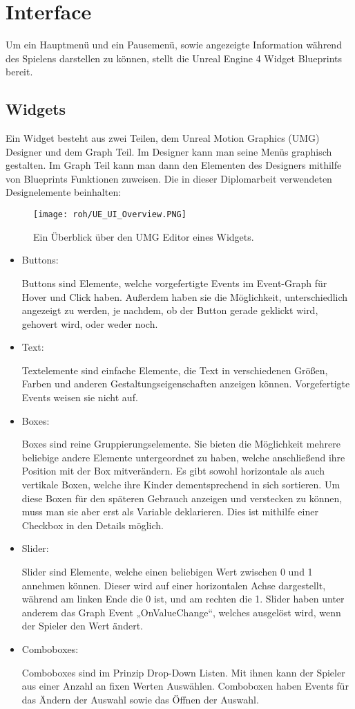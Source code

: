 \section{Interface}
Um ein Hauptmenü und ein Pausemenü, sowie angezeigte Information während des Spielens darstellen zu können, stellt die Unreal Engine 4 Widget Blueprints bereit.
\subsection{Widgets}
Ein Widget besteht aus zwei Teilen, dem Unreal Motion Graphics (UMG) Designer und dem Graph Teil.\citep{ue:UIWidgets}
Im Designer kann man seine Menüs graphisch gestalten.
Im Graph Teil kann man dann den Elementen des Designers mithilfe von Blueprints Funktionen zuweisen.
Die in dieser Diplomarbeit verwendeten Designelemente beinhalten:
\begin{figure}[H]
    \centering
    \texttt{[image: roh/UE\_UI\_Overview.PNG]}
    \caption{Ein Überblick über den UMG Editor eines Widgets.}
    \label{UE:UI_Overview}
\end{figure}
\begin{itemize}
    \item Buttons:

    Buttons sind Elemente, welche vorgefertigte Events im Event-Graph für Hover und Click haben.
    Außerdem haben sie die Möglichkeit, unterschiedlich angezeigt zu werden, je nachdem, ob der Button gerade geklickt wird, gehovert wird, oder weder noch.
    \item Text:

    Textelemente sind einfache Elemente, die Text in verschiedenen Größen, Farben und anderen Gestaltungseigenschaften anzeigen können.
    Vorgefertigte Events weisen sie nicht auf.
    \item Boxes:

    Boxes sind reine Gruppierungselemente.
    Sie bieten die Möglichkeit mehrere beliebige andere Elemente untergeordnet zu haben, welche anschließend ihre Position mit der Box mitverändern.
    Es gibt sowohl horizontale als auch vertikale Boxen, welche ihre Kinder dementsprechend in sich sortieren.
    Um diese Boxen für den späteren Gebrauch anzeigen und verstecken zu können, muss man sie aber erst als Variable deklarieren.
    Dies ist mithilfe einer Checkbox in den Details möglich.
    \item Slider:

    Slider sind Elemente, welche einen beliebigen Wert zwischen 0 und 1 annehmen können.
    Dieser wird auf einer horizontalen Achse dargestellt, während am linken Ende die 0 ist, und am rechten die 1.
    Slider haben unter anderem das Graph Event „OnValueChange“, welches ausgelöst wird, wenn der Spieler den Wert ändert.
    \item Comboboxes:

    Comboboxes sind im Prinzip Drop-Down Listen.
    Mit ihnen kann der Spieler aus einer Anzahl an fixen Werten Auswählen.
    Comboboxen haben Events für das Ändern der Auswahl sowie das Öffnen der Auswahl.
\end{itemize}
